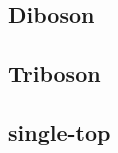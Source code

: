 \subsection{\zjets}
\label{sec:zjets_description}

\subsection{\ttbar}
\label{sec:ttbar_description}

\subsection{Diboson}
\label{sec:diboson_description}

\subsection{Triboson}
\label{sec:triboson_description}

\subsection{single-top}
\label{sec:stop_description}

